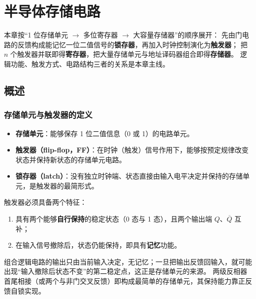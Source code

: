 \setlength{\parskip}{0.4em}
\setlength{\itemsep}{0.2em}
\setlength{\tabcolsep}{4pt}

\chapter{半导体存储电路}

本章按“1 位存储单元 $\rightarrow$ 多位寄存器 $\rightarrow$ 大容量存储器”的顺序展开：
先由门电路的反馈构成能记忆一位二值信号的\textbf{锁存器}，再加入时钟控制演化为\textbf{触发器}；
把 $n$ 个触发器并联即得\textbf{寄存器}，把大量存储单元与地址译码器组合即得\textbf{存储器}。
逻辑功能、触发方式、电路结构三者的关系是本章主线。

\section{概述}
\subsection{存储单元与触发器的定义}
\begin{itemize}
    \item \textbf{存储单元}：能够保存 1 位二值信息（0 或 1）的电路单元。
    \item \textbf{触发器（flip-flop，FF）}：在时钟（触发）信号作用下，能够按预定规律改变状态并保持新状态的存储单元电路。
    \item \textbf{锁存器（latch）}：没有独立时钟端、状态直接由输入电平决定并保持的存储单元，是触发器的最简形式。
\end{itemize}

\noindent 触发器必须具备两个特征：
\begin{enumerate}
    \item 具有两个能够\textbf{自行保持}的稳定状态（0 态与 1 态），且两个输出端 $Q$、$\overline{Q}$ 互补；
    \item 在输入信号撤除后，状态仍能保持，即具有\textbf{记忆}功能。
\end{enumerate}

组合逻辑电路的输出只由当前输入决定，无记忆；一旦把输出反馈回输入，就可能出现“输入撤除后状态不变”的第二稳定点，这正是存储单元的来源。
两级反相器首尾相接（或两个与非门交叉反馈）即构成最简单的存储单元，其保持能力靠正反馈自锁实现。

